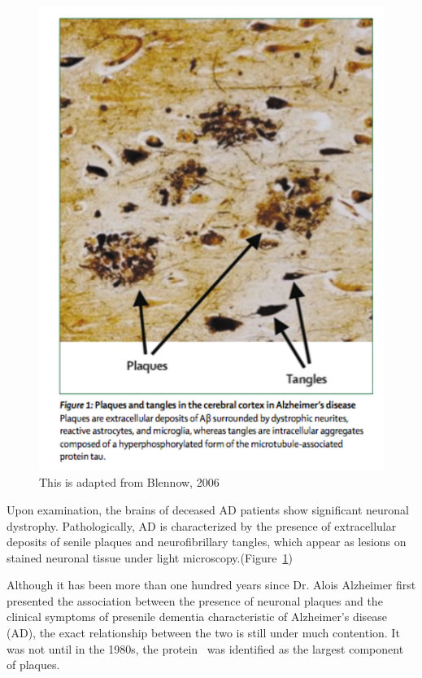 \begin{figure}
  \centering
  \includegraphics[width=6in]{figures/introduction/AD_tissue_pathology.pdf}
  \caption[Image of lesions formed by plaques and NFTs on brain tissue]{This is adapted from Blennow, 2006}
  \label{fig:AD_tissue_pathology}
\end{figure}

Upon examination, the brains of deceased AD patients show significant neuronal dystrophy.  Pathologically, AD is characterized by the presence of extracellular deposits of senile plaques and neurofibrillary tangles, which appear as lesions on stained neuronal tissue under light microscopy.(Figure~\ref{fig:AD_tissue_pathology})

Although it has been more than one hundred years since Dr. Alois Alzheimer first presented the association between the presence of neuronal plaques and the clinical symptoms of presenile dementia characteristic of Alzheimer's disease (AD), the exact relationship between the two is still under much contention.  It was not until in the 1980s, the protein \abeta\ was identified as the largest component of plaques. %


